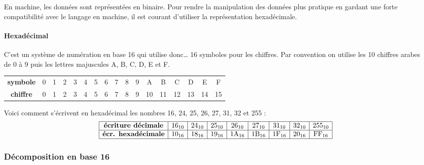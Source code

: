 \documentclass[a4paper,17pt]{extarticle}
\begin{document}
    En machine, les données sont représentées en binaire. Pour rendre la
manipulation des données plus pratique en gardant une forte
compatibilité avec le langage en machine, il est courant d'utiliser la
représentation hexadécimale.
\begin{retenir}
    \hypertarget{hexaduxe9cimal}{%
\paragraph{Hexadécimal}\label{hexaduxe9cimal}}

C'est un système de numération en base 16 qui utilise donc\ldots{} 16
symboles pour les chiffres. Par convention on utilise les 10 chiffres
arabes de \(0\) à \(9\) puis les lettres majuscules A, B, C, D, E et F.

\begin{longtable}[]{@{}ccccccccccccccccc@{}}
\toprule
\endhead
\textbf{symbole} & 0 & 1 & 2 & 3 & 4 & 5 & 6 & 7 & 8 & 9 & A & B & C & D
& E & F\tabularnewline
\textbf{chiffre} & 0 & 1 & 2 & 3 & 4 & 5 & 6 & 7 & 8 & 9 & 10 & 11 & 12
& 13 & 14 & 15\tabularnewline
\bottomrule
\end{longtable}

        \end{retenir}\begin{exemple}
    Voici comment s'écrivent en hexadécimal les nombres 16, 24, 25, 26, 27,
31, 32 et 255 : \[
\begin{array}{|c|c|c|c|c|c|c|c|c|} \hline
\textbf{écriture décimale} & 16_{10} & 24_{10} & 25_{10} & 26_{10} & 27_{10} &  31_{10} & 32_{10} & 255_{10} \\\hline
\textbf{écr. hexadécimale} & 10_{16} & 18_{16} & 19_{16} & 1\text{A}_{16} &  1\text{B}_{16} & 1\text{F}_{16} & 20_{16} & \text{FF}_{16} \\ \hline
\end{array}
\]

        \end{exemple}
    \hypertarget{duxe9composition-en-base-16}{%
\subsubsection{Décomposition en base
16}\label{duxe9composition-en-base-16}}
\end{document}
